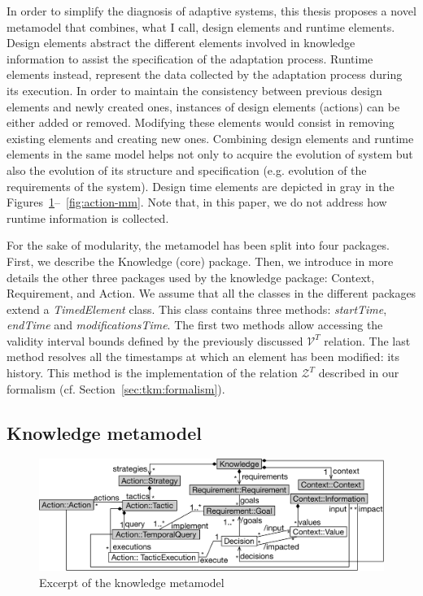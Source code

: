  In order to simplify the diagnosis of adaptive systems, this thesis proposes a novel metamodel that combines, what I call, design elements and runtime elements.
Design elements abstract the different elements involved in knowledge information to assist the specification of the adaptation process.
Runtime elements instead, represent the data collected by the adaptation process during its execution.
In order to maintain the consistency between previous design elements and newly created ones, instances of design elements (\eg actions) can be either added or removed.
Modifying these elements would consist in removing existing elements and creating new ones.
Combining design elements and runtime elements in the same model helps not only to acquire the evolution of system but also the evolution of its structure and specification (e.g. evolution of the requirements of the system).
Design time elements are depicted in gray in the Figures~\ref{fig:knowledge-mm}--~\ref{fig:action-mm}. Note that, in this paper, we do not address how runtime information is collected.

For the sake of modularity, the metamodel has been split into four packages.
First, we describe the Knowledge (core) package. 
Then, we introduce in more details the other three packages used by the knowledge package: Context, Requirement, and Action. 
We assume that all the classes in the different packages extend a \textit{TimedElement} class. 
This class contains three methods: \textit{startTime}, \textit{endTime} and \textit{modificationsTime}.
The first two methods allow accessing the validity interval bounds defined by the previously discussed $\mathcal{V}^T$ relation.
The last method resolves all the timestamps at which an element has been modified: its history. 
This method is the implementation of the relation $\mathcal{Z}^T$ described in our formalism (cf. Section~\ref{sec:tkm:formalism}).

\subsection{Knowledge metamodel}

\begin{figure}[t]
	\begin{center}
	\includegraphics[width=.8\linewidth]{img/chapt-tkm/mm/knowledge-mm}
	\caption{Excerpt of the knowledge metamodel}
	\label{fig:knowledge-mm}
	\end{center} 
\end{figure}


